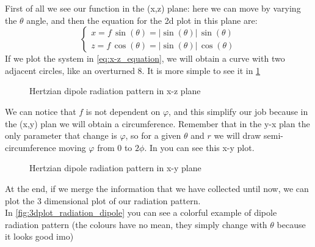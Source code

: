 First of all we see our function in the (x,z) plane: here we can move by varying the $\theta$ angle, and then the equation for the 2d plot in this plane are:
\begin{equation}
    \begin{cases}
        x=f\,\sin(\theta)=|\sin(\theta)|\,\sin(\theta)\\[5pt]
        z=f\,\cos(\theta)=|\sin(\theta)|\,\cos(\theta)
    \end{cases}\label{eq:x-z_equation}
\end{equation}
If we plot the system in \cref{eq:x-z_equation}, we will obtain a curve with two adjacent circles, like an overturned $8$. It is more simple to see it in \cref{fig:Dipolexz}
\begin{figure}[H]
    \begin{center}
        \caption{Hertzian dipole radiation pattern in x-z plane}\label{fig:Dipolexz}
    \end{center}
\end{figure}
We can notice that $f$ is not dependent on $\varphi$, and this simplify our job because in the (x,y) plan we will obtain a circumference. Remember that in the y-x plan the only parameter that change is $\varphi$, so for a given $\theta$ and $r$ we will draw semi-circumference moving $\varphi$ from $0$ to $2\phi$. In you can see this x-y plot.
\begin{figure}[H]
    \begin{center}
        \caption{Hertzian dipole radiation pattern in x-y plane}\label{fig:Dipolexy}
    \end{center}
\end{figure}
At the end, if we merge the information that we have collected until now, we can plot the 3 dimensional plot of our radiation pattern.\\
In \cref{fig:3dplot_radiation_dipole} you can see a colorful example of dipole radiation pattern (the colours have no mean, they simply change with $\theta$ because it looks good imo)

